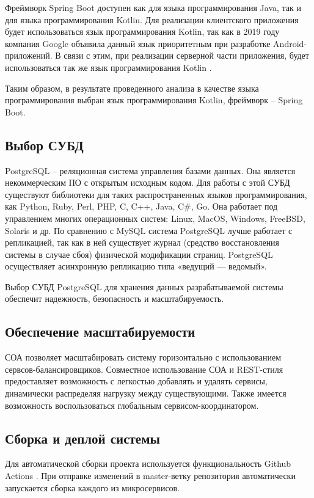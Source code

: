 Фреймворк Spring Boot доступен как для языка программирования Java, так и для языка программирования Kotlin. Для реализации клиентского приложения будет использоваться язык программирования Kotlin, так как в 2019 году компания Google объявила данный язык приоритетным при разработке Android-приложений. В связи с этим, при реализации серверной части приложения, будет использоваться так же язык программирования Kotlin \cite{Kotlin}.

Таким образом, в результате проведенного анализа в качестве языка программирования выбран язык программирования Kotlin, фреймворк -- Spring Boot.

\subsection{Выбор СУБД}
PostgreSQL – реляционная система управления базами данных. Она является некоммерческим ПО с открытым исходным кодом. Для работы с этой СУБД существуют библиотеки для таких распространенных языков программирования, как Python, Ruby, Perl, PHP, C, C++, Java, C\#, Go. Она работает под управлением многих операционных систем: Linux, MacOS, Windows, FreeBSD, Solaris и др. По сравнению с MySQL система PostgreSQL лучше работает с репликацией, так как в ней существует журнал (средство восстановления системы в случае сбоя) физической модификации страниц. PostgreSQL осуществляет асинхронную репликацию типа «ведущий — ведомый». \cite{postgres}

Выбор СУБД PostgreSQL для хранения данных разрабатываемой системы обеспечит надежность, безопасность и масштабируемость.

\subsection{Обеспечение масштабируемости}

СОА позволяет масштабировать систему горизонтально с использованием сервсов-балансировщиков. Совместное использование СОА и REST-стиля предоставляет возможность с легкостью добавлять и удалять сервисы, динамически распределяя нагрузку между существующими. Также имеется возможность воспользоваться глобальным сервисом-координатором.

\subsection{Сборка и деплой системы}

Для автоматической сборки проекта используется функциональность Github Actions \cite{ghactions}. При отправке изменений в master-ветку репозитория автоматически запускается сборка каждого из микросервисов.

